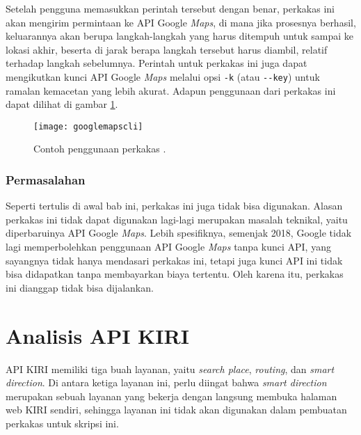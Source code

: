 Setelah pengguna memasukkan perintah tersebut dengan benar, perkakas ini akan mengirim permintaan ke API Google \textit{Maps}, di mana jika prosesnya berhasil, keluarannya akan berupa langkah-langkah yang harus ditempuh untuk sampai ke lokasi akhir, beserta di jarak berapa langkah tersebut harus diambil, relatif terhadap langkah sebelumnya. Perintah untuk perkakas ini juga dapat mengikutkan kunci API Google \textit{Maps} melalui opsi \texttt{-k} (atau \verb|--key|) untuk ramalan kemacetan yang lebih akurat. Adapun penggunaan dari perkakas ini dapat dilihat di gambar \ref{fig:similarapps-googlemapscli}.

\begin{figure}[ht]
    \centering
    \texttt{[image: googlemapscli]}
    \caption[Contoh penggunaan perkakas \googlemapscli]{Contoh penggunaan perkakas \googlemapscli.\protect\footnotemark}
    \label{fig:similarapps-googlemapscli}
\end{figure}

\subsubsection{Permasalahan}
\label{sec:similarapps-googlemapscli-problem}

Seperti tertulis di awal bab ini, perkakas ini juga tidak bisa digunakan. Alasan perkakas ini tidak dapat digunakan lagi-lagi merupakan masalah teknikal, yaitu diperbaruinya API Google \textit{Maps}. Lebih spesifiknya, semenjak 2018, Google tidak lagi memperbolehkan penggunaan API Google \textit{Maps} tanpa kunci API, yang sayangnya tidak hanya mendasari perkakas ini, tetapi juga kunci API ini tidak bisa didapatkan tanpa membayarkan biaya tertentu. Oleh karena itu, perkakas ini dianggap tidak bisa dijalankan.

\section{Analisis API KIRI}
\label{sec:analysis-kiri}

API KIRI memiliki tiga buah layanan, yaitu \textit{search place}, \textit{routing}, dan \textit{smart direction}. Di antara ketiga layanan ini, perlu diingat bahwa \textit{smart direction} merupakan sebuah layanan yang bekerja dengan langsung membuka halaman web KIRI sendiri, sehingga layanan ini tidak akan digunakan dalam pembuatan perkakas \cl untuk skripsi ini.

